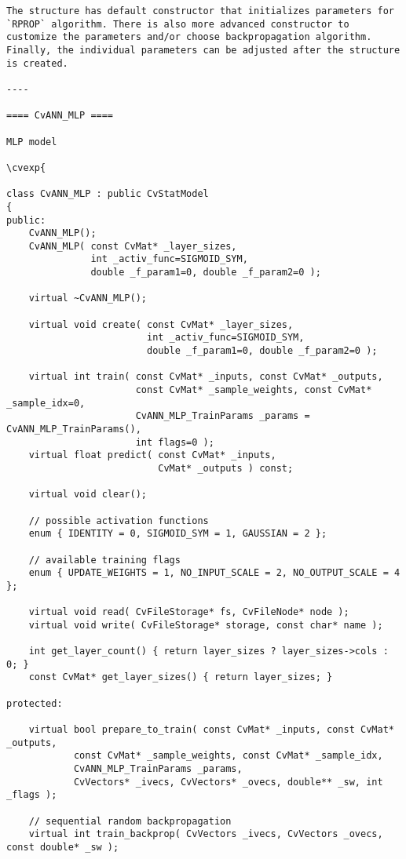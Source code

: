 \begin{verbatim}
The structure has default constructor that initializes parameters for `RPROP` algorithm. There is also more advanced constructor to customize the parameters and/or choose backpropagation algorithm. Finally, the individual parameters can be adjusted after the structure is created.

----

==== CvANN_MLP ====

MLP model

\cvexp{

class CvANN_MLP : public CvStatModel
{
public:
    CvANN_MLP();
    CvANN_MLP( const CvMat* _layer_sizes,
               int _activ_func=SIGMOID_SYM,
               double _f_param1=0, double _f_param2=0 );

    virtual ~CvANN_MLP();

    virtual void create( const CvMat* _layer_sizes,
                         int _activ_func=SIGMOID_SYM,
                         double _f_param1=0, double _f_param2=0 );

    virtual int train( const CvMat* _inputs, const CvMat* _outputs,
                       const CvMat* _sample_weights, const CvMat* _sample_idx=0,
                       CvANN_MLP_TrainParams _params = CvANN_MLP_TrainParams(),
                       int flags=0 );
    virtual float predict( const CvMat* _inputs,
                           CvMat* _outputs ) const;

    virtual void clear();

    // possible activation functions
    enum { IDENTITY = 0, SIGMOID_SYM = 1, GAUSSIAN = 2 };

    // available training flags
    enum { UPDATE_WEIGHTS = 1, NO_INPUT_SCALE = 2, NO_OUTPUT_SCALE = 4 };

    virtual void read( CvFileStorage* fs, CvFileNode* node );
    virtual void write( CvFileStorage* storage, const char* name );

    int get_layer_count() { return layer_sizes ? layer_sizes->cols : 0; }
    const CvMat* get_layer_sizes() { return layer_sizes; }

protected:

    virtual bool prepare_to_train( const CvMat* _inputs, const CvMat* _outputs,
            const CvMat* _sample_weights, const CvMat* _sample_idx,
            CvANN_MLP_TrainParams _params,
            CvVectors* _ivecs, CvVectors* _ovecs, double** _sw, int _flags );

    // sequential random backpropagation
    virtual int train_backprop( CvVectors _ivecs, CvVectors _ovecs, const double* _sw );


\end{verbatim}
